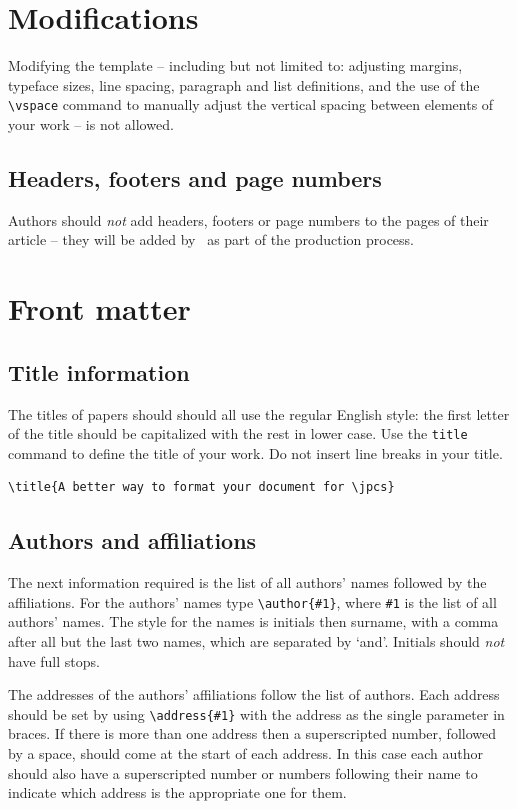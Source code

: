 \documentclass[a4paper]{jpconf}
\begin{document}
\section{Modifications}
\label{nomodify}

Modifying the template -- including but not limited to: adjusting
margins, typeface sizes, line spacing, paragraph and list definitions,
and the use of the \verb|\vspace| command to manually adjust the
vertical spacing between elements of your work -- is not allowed.

\subsection{Headers, footers and page numbers}
Authors should {\it not} add headers, footers or page numbers to the pages of their article -- they will be added by \iopp\ as part of the production process.


\section{Front matter}
\label{fpage}

\subsection{Title information}

The titles of papers should should all use the regular English style: the first letter of the title should be capitalized with the rest in lower case. Use the \verb|title| command to define the title of your work. Do not
insert line breaks in your title.
\begin{verbatim}
\title{A better way to format your document for \jpcs}
\end{verbatim}


\subsection{Authors and affiliations}

The next information required is the list of all authors' names followed by 
the affiliations. For the authors' names type \verb"\author{#1}", 
where \verb"#1" is the 
list of all authors' names. The style for the names is initials then
surname, with a comma after all but the last 
two names, which are separated by `and'. Initials should {\it not} have 
full stops. 

The addresses of the authors' affiliations follow the list of authors. 
Each address should be set by using
\verb"\address{#1}" with the address as the single parameter in braces. 
If there is more 
than one address then a superscripted number, followed by a space, should come at the start of
each address. In this case each author should also have a superscripted number or numbers following their name to indicate which address is the appropriate one for them.
\end{document}
